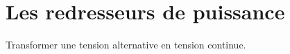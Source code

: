 


\section{Les redresseurs de puissance}

Transformer une tension alternative en tension continue.






